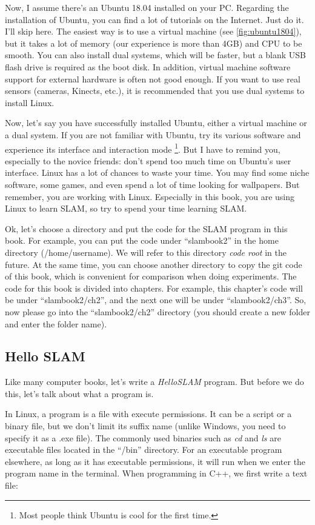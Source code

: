 Now, I assume there's an Ubuntu 18.04 installed on your PC. Regarding the installation of Ubuntu, you can find a lot of tutorials on the Internet. Just do it. I'll skip here. The easiest way is to use a virtual machine (see \autoref{fig:ubuntu1804}), but it takes a lot of memory (our experience is more than 4GB) and CPU to be smooth. You can also install dual systems, which will be faster, but a blank USB flash drive is required as the boot disk. In addition, virtual machine software support for external hardware is often not good enough. If you want to use real sensors (cameras, Kinects, etc.), it is recommended that you use dual systems to install Linux.

Now, let's say you have successfully installed Ubuntu, either a virtual machine or a dual system. If you are not familiar with Ubuntu, try its various software and experience its interface and interaction mode \footnote{Most people think Ubuntu is cool for the first time. }. But I have to remind you, especially to the novice friends: don't spend too much time on Ubuntu's user interface. Linux has a lot of chances to waste your time. You may find some niche software, some games, and even spend a lot of time looking for wallpapers. But remember, you are working with Linux. Especially in this book, you are using Linux to learn SLAM, so try to spend your time learning SLAM.

Ok, let's choose a directory and put the code for the SLAM program in this book. For example, you can put the code under ``slambook2'' in the home directory (/home/username). We will refer to this directory \textit{code root} in the future. At the same time, you can choose another directory to copy the git code of this book, which is convenient for comparison when doing experiments. The code for this book is divided into chapters. For example, this chapter's code will be under ``slambook2/ch2'', and the next one will be under ``slambook2/ch3''. So, now please go into the ``slambook2/ch2'' directory (you should create a new folder and enter the folder name).

\subsection{Hello SLAM}
Like many computer books, let's write a \textit{HelloSLAM} program. But before we do this, let's talk about what a program is.

In Linux, a program is a file with execute permissions. It can be a script or a binary file, but we don't limit its suffix name (unlike Windows, you need to specify it as a .exe file). The commonly used binaries such as \textit{cd} and \textit{ls} are executable files located in the ``/bin'' directory. For an executable program elsewhere, as long as it has executable permissions, it will run when we enter the program name in the terminal. When programming in C++, we first write a text file:

